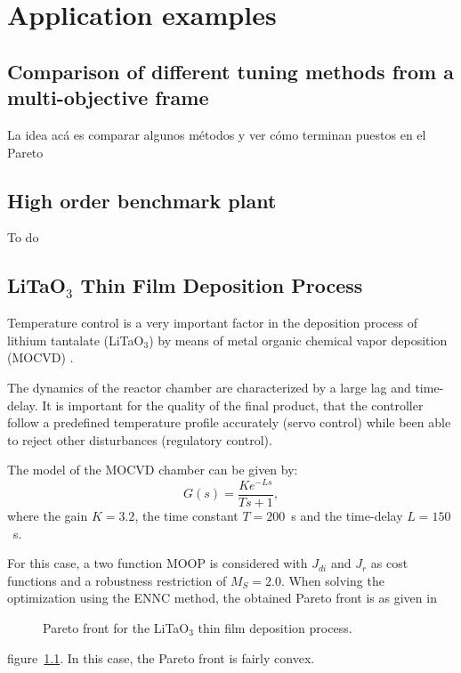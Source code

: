 \chapter{Application examples}
\label{chap:ApplicationExamples}
%
\section{Comparison of different tuning methods from a multi-objective frame}
La idea acá es comparar algunos métodos y ver cómo terminan puestos en el Pareto
%
\section{High order benchmark plant}
\label{sec:Bechmark}
To do
%
\section{LiTaO$_3$ Thin Film Deposition Process}
\label{sec:LiTAO3}
Temperature control is a very important factor in the deposition process of lithium tantalate (LiTaO$_3$) by means of metal organic chemical vapor deposition (MOCVD) \cite{Zhang2004}.


The dynamics of the reactor chamber are characterized by a large lag and time-delay. It is important for the quality of the final product, that the controller follow a predefined temperature profile accurately (servo control) while been able to reject other disturbances (regulatory control).

The model of the MOCVD chamber can be given by:
\begin{equation}
G(s) = \frac{K e^{-L s}}{T s+1},
\label{eq:GsLita}
\end{equation}
%
where the gain $K = 3.2$, the time constant $T = 200$~s and the time-delay $L = 150$~s.

For this case, a two function MOOP is considered with $J_{di}$ and $J_{r}$ as cost functions and a robustness restriction of $M_S = 2.0$. When solving the optimization using the ENNC method, the obtained Pareto front is as given in %
\begin{figure}
	\centering
	\caption{Pareto front for the LiTaO$_3$ thin film deposition process.}
	\label{fig:LitaPareto}
\end{figure}
%
figure~\ref{fig:LitaPareto}. In this case, the Pareto front is fairly convex.
%
